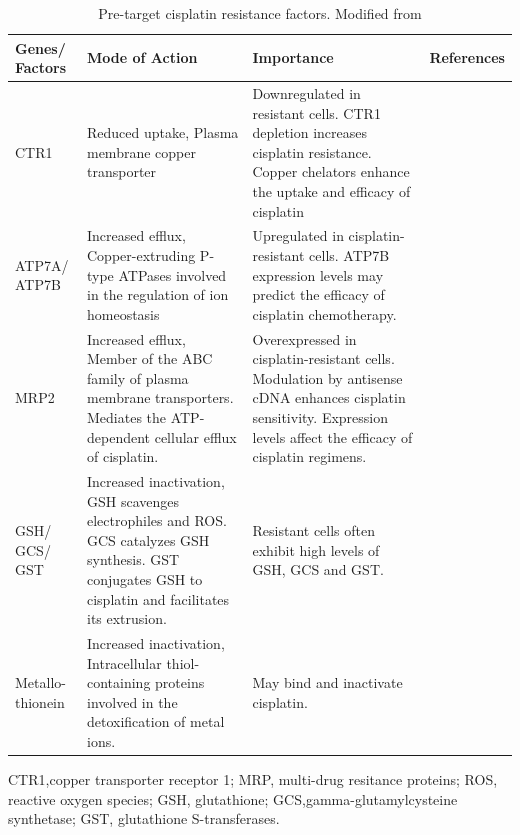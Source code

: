\begin{table}[htbp]
   \centering
   \caption{Pre-target cisplatin resistance factors. Modified from \cite{galluzzi2012molecular}}
\begin{tabular}{p{1.5cm}p{5cm}p{5cm}p{1cm}}
\hline
\textbf{Genes/ Factors} & \multicolumn{1}{l}{ \textbf{Mode of Action}} & \multicolumn{1}{p{5cm}}{ \textbf{Importance}} & \multicolumn{1}{p{5cm}}{ \textbf{References}} \\ \hline

CTR1   & Reduced uptake, Plasma membrane copper transporter & Downregulated in resistant cells. CTR1 depletion increases cisplatin resistance. Copper chelators enhance the uptake and efficacy of cisplatin & \multicolumn{1}{p{5cm}}{ \cite{more2010role, ishida2010enhancing,holzer2006contribution,katano2002acquisition}} \\

ATP7A/ ATP7B & Increased efflux, Copper-extruding P-type ATPases involved in the regulation of ion homeostasis & Upregulated in cisplatin-resistant cells. ATP7B expression levels may predict the efficacy of cisplatin chemotherapy.  & \multicolumn{1}{p{5cm}}{\cite{katano2002acquisition,komatsu2000copper,nakayama2002copper,safaei2004role,aida2005expression}} \\ 

MRP2   & Increased efflux, Member of the ABC family of plasma membrane transporters. Mediates the ATP-dependent cellular efflux of cisplatin. & Overexpressed in cisplatin-resistant cells. Modulation by antisense cDNA enhances cisplatin sensitivity. Expression levels affect the efficacy of cisplatin regimens. & \multicolumn{1}{p{5cm}}{\cite{cui1999drug,korita2010multidrug,liedert2003overexpression, yamasaki2011role}} \\

GSH/ GCS/ GST & Increased inactivation, GSH scavenges electrophiles and ROS. GCS catalyzes GSH synthesis. GST conjugates GSH to cisplatin and facilitates its extrusion. & Resistant cells often exhibit high levels of GSH, GCS and GST.  & \multicolumn{1}{p{5cm}}{\cite{lewis1988glutathione,chen2010role}} \\

Metallo-thionein & Increased inactivation, Intracellular thiol-containing proteins involved in the detoxification of metal ions. & May bind and inactivate cisplatin.  & \multicolumn{1}{p{5cm}}{\cite{kelley1988overexpression,kasahara1991metallothionein}} \\   \hline
\end{tabular}%
\begin{tablenotes}
\small
      \item  {CTR1,copper transporter receptor 1; MRP, multi-drug resitance proteins; ROS, reactive oxygen species; GSH, glutathione; GCS,gamma-glutamylcysteine synthetase; GST, glutathione S-transferases}.
    \end{tablenotes}
 
   \label{tab:pretargetcisplatinresistance}%
 \end{table}%

